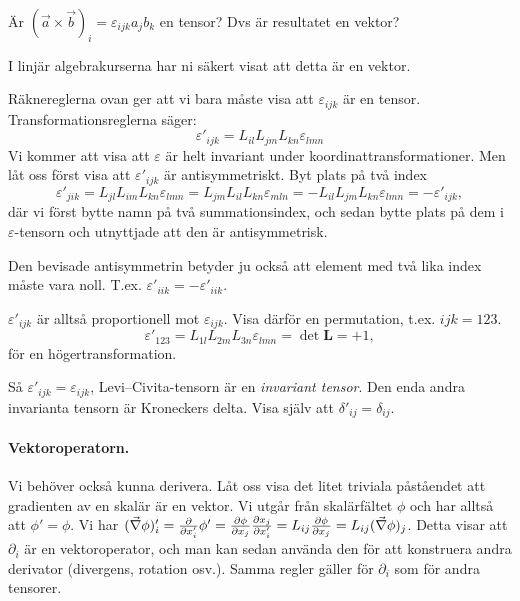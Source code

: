 \documentclass[%
oneside,                 %
final,                   %
10pt]{article}
\newenvironment{notice_mdfboxadmon}[1][]{
\begin{notice_mdfboxmdframed}[frametitle=#1]
}
{
\end{notice_mdfboxmdframed}
}
\newenvironment{warning_mdfboxadmon}[1][]{
\begin{warning_mdfboxmdframed}[frametitle=#1]
}
{
\end{warning_mdfboxmdframed}
}
\begin{document}
\begin{notice_mdfboxadmon}
Är $(\vec a\times\vec b)_i = \varepsilon_{ijk}a_jb_k$ en tensor? Dvs är resultatet en vektor? 


\begin{warning_mdfboxadmon}[Kommentar]
I linjär algebrakurserna har ni säkert visat att detta är en vektor.
\end{warning_mdfboxadmon} %



Räknereglerna ovan ger att vi bara måste visa att $\varepsilon_{ijk}$ är en tensor. Transformationsreglerna säger:
\begin{equation}
\varepsilon'_{ijk}=L_{il}L_{jm}L_{kn}\varepsilon_{lmn}
\end{equation}
Vi kommer att visa att $\varepsilon$ är helt invariant under koordinattransformationer. Men låt oss först visa att $\varepsilon'_{ijk}$ är antisymmetriskt. Byt plats på två index
\begin{equation}
\varepsilon'_{jik}=L_{jl}L_{im}L_{kn}\varepsilon_{lmn} = L_{jm}L_{il}L_{kn}\varepsilon_{mln} = - L_{il} L_{jm}L_{kn}\varepsilon_{lmn} = - \varepsilon'_{ijk},
\end{equation}
där vi först bytte namn på två summationsindex, och sedan bytte plats på dem i $\varepsilon$-tensorn och utnyttjade att den är antisymmetrisk. 

Den bevisade antisymmetrin betyder ju också att element med två lika index måste vara noll. T.ex. $\varepsilon'_{iik} = -\varepsilon'_{iik}$.

$\varepsilon'_{ijk}$ är alltså proportionell mot $\varepsilon_{ijk}$. Visa därför en permutation, t.ex. $ijk=123$. 
\begin{equation}
\varepsilon'_{123}=L_{1l}L_{2m}L_{3n}\varepsilon_{lmn} = \det \mathbf{L} = +1,
\end{equation}
för en högertransformation.

Så $\varepsilon'_{ijk}=\varepsilon_{ijk}$, Levi--Civita-tensorn är en \emph{invariant tensor}. Den enda andra invarianta tensorn är Kroneckers delta. Visa själv att $\delta'_{ij}=\delta_{ij}$.
\end{notice_mdfboxadmon} %



\paragraph{Vektoroperatorn.}
Vi behöver också kunna derivera. Låt oss visa det litet triviala påståendet att gradienten
av en skalär är en vektor. Vi utgår från skalärfältet $\phi$ och har alltså att $\phi' = \phi$. Vi har $(\vec{\nabla}\phi)'_i=\frac{\partial}{\partial x'_i}\phi'=\frac{\partial \phi}{\partial x_j} \frac{\partial x_j}{\partial x'_i}=
L_{ij} \frac{\partial \phi}{\partial x_j}=L_{ij}(\vec{\nabla}\phi)_j$. Detta visar att $\partial _i$ är en vektoroperator, och man kan sedan använda den för att konstruera andra derivator (divergens, rotation osv.). Samma regler gäller för $\partial _i$ som för andra tensorer.
\end{document}
